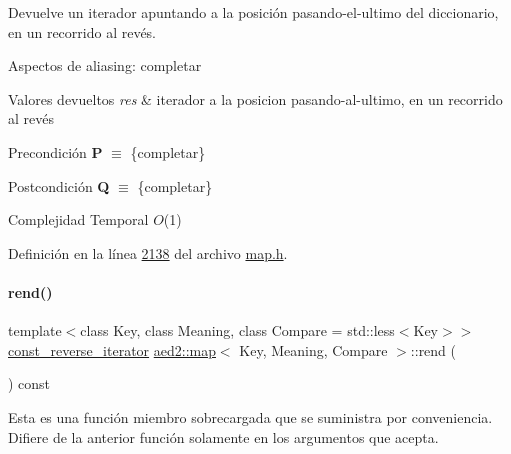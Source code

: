 Devuelve un iterador apuntando a la posición pasando-\/el-\/ultimo del diccionario, en un recorrido al revés. 

\begin{DoxyParagraph}{Aspectos de aliasing\+:}
completar
\end{DoxyParagraph}

\begin{DoxyRetVals}{Valores devueltos}
{\em res} & iterador a la posicion pasando-\/al-\/ultimo, en un recorrido al revés\\
\hline
\end{DoxyRetVals}
\begin{DoxyPrecond}{Precondición}
{\bfseries P} $\equiv$ \{completar\} 
\end{DoxyPrecond}
\begin{DoxyPostcond}{Postcondición}
{\bfseries Q} $\equiv$ \{completar\}
\end{DoxyPostcond}

\begin{DoxyDescription}
\item[Complejidad Temporal]$O$(1)
\end{DoxyDescription}

Definición en la línea \hyperlink{map_8h_source_l02138}{2138} del archivo \hyperlink{map_8h_source}{map.\+h}.

\mbox{\label{classaed2_1_1map_a7cf14a4b505505d0f074034b7399fb24_a7cf14a4b505505d0f074034b7399fb24}} 
\paragraph{\texorpdfstring{rend()}{rend()}\hspace{0.1cm}{\footnotesize\ttfamily [2/2]}}
{\footnotesize\ttfamily template$<$class Key, class Meaning, class Compare = std\+::less$<$\+Key$>$$>$ \\
\hyperlink{classaed2_1_1map_aed66a216549d13078a3ea6978ea0b768_aed66a216549d13078a3ea6978ea0b768}{const\+\_\+reverse\+\_\+iterator} \hyperlink{classaed2_1_1map}{aed2\+::map}$<$ Key, Meaning, Compare $>$\+::rend (\begin{DoxyParamCaption}{ }\end{DoxyParamCaption}) const\hspace{0.3cm}{\ttfamily [inline]}}

Esta es una función miembro sobrecargada que se suministra por conveniencia. Difiere de la anterior función solamente en los argumentos que acepta. 

